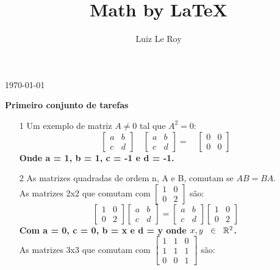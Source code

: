 \documentclass[11pt]{article}
\title{Math by \LaTeX}
\date{}
\author{Luiz Le Roy}
\begin{document}
  \maketitle
  \today
  
\begin{center}
{\LARGE \textbf{  Primeiro conjunto de tarefas}}
\end{center}

\begin{itemize}
\item[1] Um exemplo de matriz $A \neq 0$ tal que $A^2=0$:
$$
\left[\begin{array}{rr}
a&b\\
c&d
\end{array}\right]
\quad
\left[\begin{array}{cc}
a&b\\
c&d
\end{array}\right]
=
\quad
\left[\begin{array}{cc}
0&0\\
0&0
\end{array}\right]
$$
\textbf{Onde a = 1, b = 1, c = -1 e d = -1.}
\item[2] As matrizes quadradas de ordem n, A e B, comutam se $AB = BA$. 
\\As matrizes 2x2 que comutam com $\left[\begin{array}{cc}
1&0\\0&2
\end{array}\right]$ são:
$$
\begin{bmatrix}
1&0\\0&2
\end{bmatrix}
\begin{bmatrix}
a&b\\c&d
\end{bmatrix}
=
\begin{bmatrix}
a&b\\c&d
\end{bmatrix}
\begin{bmatrix}
1&0\\0&2
\end{bmatrix}
$$
\textbf{Com a = 0, c = 0, b = x e d = y onde $x,y\hspace{2mm}\in\hspace{2mm}\mathbb{R}^2$.}
\\As matrizes 3x3 que comutam com 
$\begin{bmatrix}
1&1&0\\1&1&1\\0&0&1
\end{bmatrix}$ são:

\end{itemize}
\end{document}

